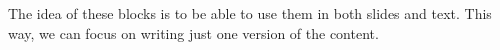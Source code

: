 \begin{idea}\label{theidea}
  The idea of these blocks is to be able to use them in both slides and text.
  This way, we can focus on writing just one version of the content.
\end{idea}
